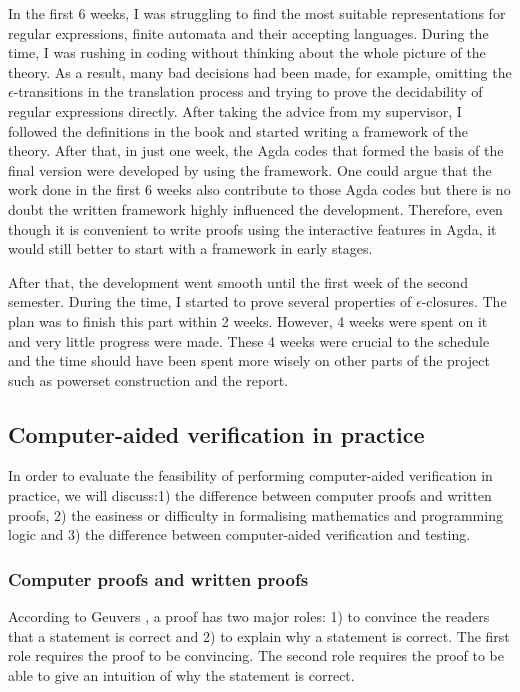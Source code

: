 \par In the first 6 weeks, I was struggling to find
the most suitable representations for regular expressions, finite
automata and their accepting languages. During the time, I was
rushing in coding without thinking about the whole picture of
the theory. As a result, many bad decisions had been made, for example, omitting the
\(\epsilon\)-transitions in the translation process and trying to prove
the decidability of regular expressions directly. After taking the
advice from my supervisor, I followed the definitions in the
book \cite{aho1972} and started writing a framework of the
theory. After that, in just one week, the Agda
codes that formed the basis of the final version were developed by
using the framework. One could argue that the work
done in the first 6 weeks also contribute to those Agda codes but
there is no doubt the written framework highly influenced the
development. Therefore, even though it is convenient to write proofs
using the interactive features in Agda,
it would still better to start with a framework in early stages. 

\par After that, the development went smooth until the first week of
the second semester. During the time, I started to prove several
properties of \(\epsilon\)-closures. The plan was to finish this part
within 2 weeks. However, 4 weeks were spent on it and very little
progress were made. These 4 weeks were crucial to the schedule and
the time should have been spent more wisely on other parts of the
project such as powerset construction and the report. 


\subsection{Computer-aided verification in practice}
\par In order to evaluate the feasibility of performing computer-aided verification in
practice, we will discuss:1) the difference between computer proofs and written proofs, 2) the easiness or
difficulty in formalising mathematics and programming logic and 3) the
difference between computer-aided verification and testing. 


\subsubsection{Computer proofs and written proofs}
\par According to Geuvers \cite{geuvers2009}, a proof has two major roles: 1)
to convince the readers that a statement is correct and 2) to explain
why a statement is correct. The first role requires the proof to be
convincing. The second role requires the proof to be able to give an
intuition of why the statement is correct. 

